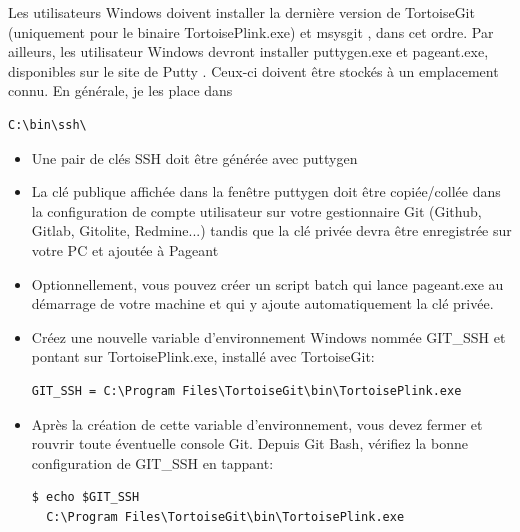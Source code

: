 \documentclass[a4paper]{../../common/tufte-latex/tufte-handout}
\begin{document}
Les utilisateurs Windows doivent installer la dernière version de TortoiseGit  (uniquement pour le binaire TortoisePlink.exe) et msysgit , dans cet ordre.
Par ailleurs, les utilisateur Windows devront installer puttygen.exe et pageant.exe, disponibles sur le site de Putty . Ceux-ci doivent être stockés à un emplacement connu. En générale, je les place dans 

\begin{lstlisting}[style=BashInputStyle]
  C:\bin\ssh\
\end{lstlisting}

\begin{itemize}

\item{Une pair de clés SSH doit être générée avec puttygen}
\item{La clé publique affichée dans la fenêtre puttygen doit être copiée/collée dans la configuration de compte utilisateur sur votre gestionnaire Git (Github, Gitlab, Gitolite, Redmine...) tandis que la clé privée devra être enregistrée sur votre PC et ajoutée à Pageant} 
\item{Optionnellement, vous pouvez créer un script batch qui lance pageant.exe au démarrage de votre machine et qui y ajoute automatiquement la clé privée.}
\item{Créez une nouvelle variable d'environnement Windows nommée GIT\_SSH et pontant sur TortoisePlink.exe, installé avec TortoiseGit:}
\begin{lstlisting}[style=BashInputStyle]
  GIT_SSH = C:\Program Files\TortoiseGit\bin\TortoisePlink.exe
\end{lstlisting}
\item{Après la création de cette variable d'environnement, vous devez fermer et rouvrir toute éventuelle console Git. Depuis Git Bash, vérifiez la bonne configuration de GIT\_SSH en tappant:}

\begin{lstlisting}[style=BashInputStyle]
  $ echo $GIT_SSH
  C:\Program Files\TortoiseGit\bin\TortoisePlink.exe
\end{lstlisting}

\end{itemize}
\end{document}
